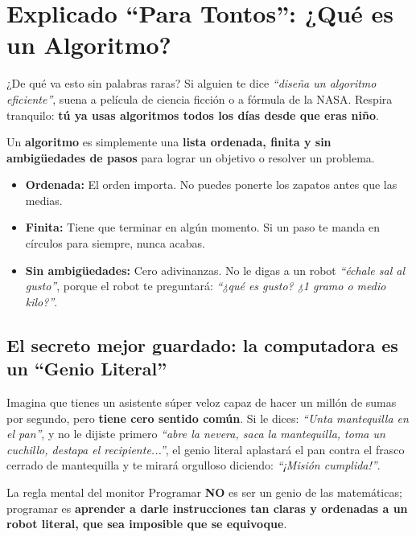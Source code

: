 \documentclass[11pt,letterpaper]{article}
\begin{document}
\section{Explicado ``Para Tontos'': ¿Qué es un Algoritmo?}


\begin{paratontos}{¿De qué va esto sin palabras raras?}
Si alguien te dice \textit{``diseña un algoritmo eficiente''}, suena a película de ciencia ficción o a fórmula de la NASA. Respira tranquilo: \textbf{tú ya usas algoritmos todos los días desde que eras niño}.

Un \textbf{algoritmo} es simplemente una \textbf{lista ordenada, finita y sin ambigüedades de pasos} para lograr un objetivo o resolver un problema.
\begin{itemize}
  \item \textbf{Ordenada:} El orden importa. No puedes ponerte los zapatos antes que las medias.
  \item \textbf{Finita:} Tiene que terminar en algún momento. Si un paso te manda en círculos para siempre, nunca acabas.
  \item \textbf{Sin ambigüedades:} Cero adivinanzas. No le digas a un robot \textit{``échale sal al gusto''}, porque el robot te preguntará: \textit{``¿qué es gusto? ¿1 gramo o medio kilo?''}.
\end{itemize}
\end{paratontos}

\subsection{El secreto mejor guardado: la computadora es un ``Genio Literal''}

Imagina que tienes un asistente súper veloz capaz de hacer un millón de sumas por segundo, pero \textbf{tiene cero sentido común}. Si le dices:
\textit{``Unta mantequilla en el pan''},
y no le dijiste primero \textit{``abre la nevera, saca la mantequilla, toma un cuchillo, destapa el recipiente...''}, el genio literal aplastará el pan contra el frasco cerrado de mantequilla y te mirará orgulloso diciendo: \textit{``¡Misión cumplida!''}.

\begin{consejo}{La regla mental del monitor}
Programar \textbf{NO} es ser un genio de las matemáticas; programar es \textbf{aprender a darle instrucciones tan claras y ordenadas a un robot literal, que sea imposible que se equivoque}.
\end{consejo}
\end{document}
